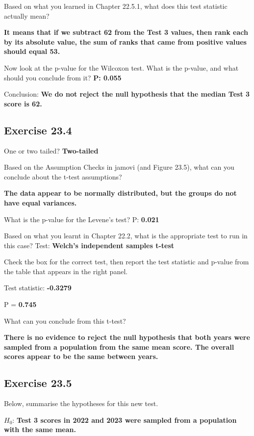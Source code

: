 \documentclass[
  openany]{krantz}
\begin{document}
Based on what you learned in Chapter 22.5.1, what does this test statistic actually mean?

\textbf{It means that if we subtract 62 from the Test 3 values, then rank each by its absolute value, the sum of ranks that came from positive values should equal 53.}

Now look at the p-value for the Wilcoxon test. What is the p-value, and what
should you conclude from it? \textbf{P: 0.055}

Conclusion: \textbf{We do not reject the null hypothesis that the median Test 3 score is 62.}

\hypertarget{exercise-23.4}{%
\subsection{Exercise 23.4}\label{exercise-23.4}}

One or two tailed? \textbf{Two-tailed}

Based on the Assumption Checks in jamovi (and Figure 23.5), what can you conclude about the t-test assumptions?

\textbf{The data appear to be normally distributed, but the groups do not have equal variances.}

What is the p-value for the Levene's test? P: \textbf{0.021}

Based on what you learnt in Chapter 22.2, what is the appropriate test to run in this case? Test: \textbf{Welch's independent samples t-test}

Check the box for the correct test, then report the test statistic and p-value from the table that appears in the right panel.

Test statistic: \textbf{-0.3279}

P = \textbf{0.745}

What can you conclude from this t-test?

\textbf{There is no evidence to reject the null hypothesis that both years were sampled from a population from the same mean score. The overall scores appear to be the same between years.}

\hypertarget{exercise-23.5}{%
\subsection{Exercise 23.5}\label{exercise-23.5}}

Below, summarise the hypotheses for this new test.

\(H_{0}\): \textbf{Test 3 scores in 2022 and 2023 were sampled from a population with the same mean.}
\end{document}
